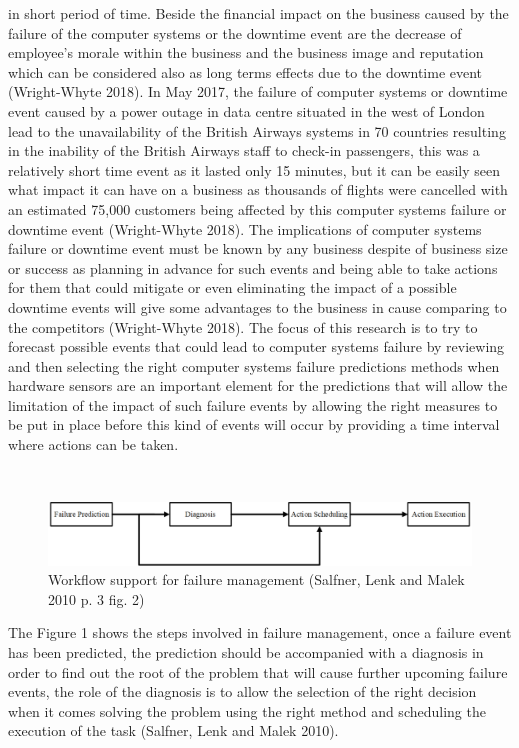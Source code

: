 in short period of time. Beside the financial impact on the business caused by the failure of the computer systems
or the downtime event are the decrease of employee’s morale within the business and the business image and reputation
which can be considered also as long terms effects due to the downtime event (Wright-Whyte 2018).
In May 2017, the failure of computer systems or downtime event caused by a power outage in data centre situated in the
west of London lead to the unavailability of the British Airways systems in 70 countries resulting in the inability of
the British Airways staff to check-in passengers, this was a relatively short time event as it lasted only 15 minutes,
but it can be easily seen what impact it can have on a business as thousands of flights were cancelled with an estimated
75,000 customers being affected by this computer systems failure or downtime event (Wright-Whyte 2018).
The implications of computer systems failure or downtime event must be known by any business despite of business size
or success as planning in advance for such events and being able to take actions for them that could mitigate or even
eliminating the impact of a possible downtime events will give some advantages to the business in cause comparing to
the competitors (Wright-Whyte 2018).
\newpage
The focus of this research is to try to forecast possible events that could lead to computer systems failure by
reviewing and then selecting the right computer systems failure predictions methods when hardware sensors are an
important element for the predictions that will allow the limitation of the impact of such failure events by
allowing the right measures to be put in place before this kind of events will occur by providing a time interval
where actions can be taken.

\
\begin{figure}[h]
    \centering
    \includegraphics[width=1.0\textwidth]{images/failure_steps.pdf}
    \captionsetup{justification=centering}
    \caption[Workflow support for failure management]{Workflow support for failure management
                                                     (Salfner, Lenk and Malek 2010 p. 3 fig. 2)}
    \label{fig:failure-steps}
\end{figure}

The Figure 1 shows the steps involved in failure management, once a failure event has been predicted,
the prediction should be accompanied with a diagnosis in order to find out the root of the problem
that will cause further upcoming failure events, the role of the diagnosis is to allow the selection
of the right decision when it comes solving the problem using the right method and scheduling the
execution of the task (Salfner, Lenk and Malek 2010).

